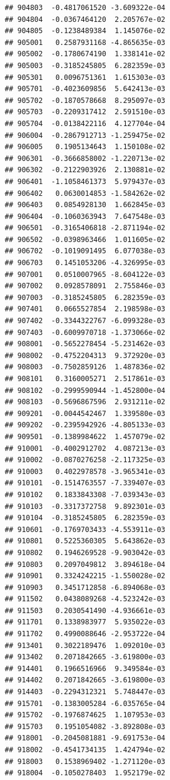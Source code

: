 \begin{frame}[fragile]
\begin{verbatim}
## 904803  -0.4817061520 -3.609322e-04
## 904804  -0.0367464120  2.205767e-02
## 904805  -0.1238489384  1.145076e-02
## 905001   0.2587931168 -4.865635e-03
## 905002  -0.1780674190  1.338141e-02
## 905003  -0.3185245805  6.282359e-03
## 905301   0.0096751361  1.615303e-03
## 905701  -0.4023609856  5.642413e-03
## 905702  -0.1870578668  8.295097e-03
## 905703  -0.2209317412  2.591510e-03
## 905704  -0.0138422116  4.127704e-04
## 906004  -0.2867912713 -1.259475e-02
## 906005   0.1905134643  1.150108e-02
## 906301  -0.3666858002 -1.220713e-02
## 906302  -0.2122903926  2.130881e-02
## 906401  -1.1058461373  5.979437e-03
## 906402   0.0630014853 -1.584262e-02
## 906403   0.0854928130  1.662845e-03
## 906404  -0.1060363943  7.647548e-03
## 906501  -0.3165406818 -2.871194e-02
## 906502  -0.0398963466  1.011605e-02
## 906702  -0.1019091495  6.077038e-03
## 906703   0.1451053206 -4.326995e-03
## 907001   0.0510007965 -8.604122e-03
## 907002   0.0928578091  2.755846e-03
## 907003  -0.3185245805  6.282359e-03
## 907401   0.0665527854  2.198598e-03
## 907402  -0.3344322767 -6.099328e-03
## 907403  -0.6009970718 -1.373066e-02
## 908001  -0.5652278454 -5.231462e-03
## 908002  -0.4752204313  9.372920e-03
## 908003  -0.7502859126  1.487836e-02
## 908101   0.3160005271  2.517861e-03
## 908102  -0.2999590944 -1.452800e-04
## 908103  -0.5696867596  2.931211e-02
## 909201  -0.0044542467  1.339580e-03
## 909202  -0.2395942926 -4.805133e-03
## 909501  -0.1389984622  1.457079e-02
## 910001  -0.4002912702  4.087213e-03
## 910002  -0.0870276258 -2.117325e-03
## 910003   0.4022978578 -3.965341e-03
## 910101  -0.1514763557 -7.339407e-03
## 910102   0.1833843308 -7.039343e-03
## 910103  -0.3317372758  9.892301e-03
## 910104  -0.3185245805  6.282359e-03
## 910601  -0.1769703433 -4.553911e-03
## 910801   0.5225360305  5.643862e-03
## 910802   0.1946269528 -9.903042e-03
## 910803   0.2097049812  3.894618e-04
## 910901   0.3324242215 -1.550028e-02
## 910903   0.3451712858 -6.894068e-03
## 911502   0.0438089268 -4.523242e-03
## 911503   0.2030541490 -4.936661e-03
## 911701   0.1338983977  5.935022e-03
## 911702   0.4990088646 -2.953722e-04
## 913401   0.3022189476  1.092010e-03
## 913402   0.2071842665 -3.619800e-03
## 914401   0.1966516966  9.349584e-03
## 914402   0.2071842665 -3.619800e-03
## 914403  -0.2294312321  5.748447e-03
## 915701  -0.1383005284 -6.035765e-04
## 915702  -0.1976874625  1.107953e-03
## 915703   0.1951054082 -3.892808e-03
## 918001  -0.2045081881 -9.691753e-04
## 918002  -0.4541734135  1.424794e-02
## 918003   0.1538969402 -1.271120e-03
## 918004  -0.1050278403  1.952179e-02

\end{verbatim}
\end{frame}
